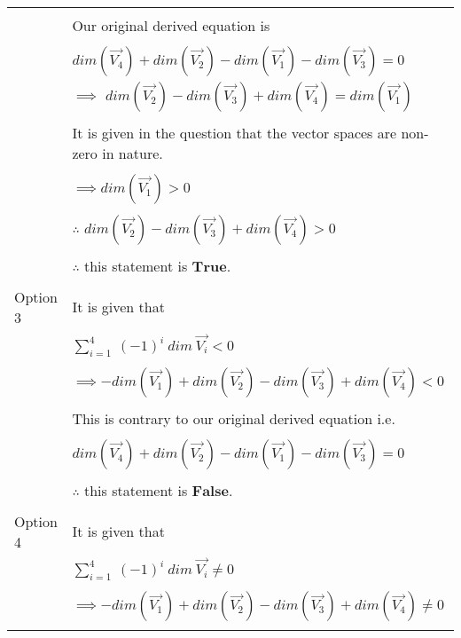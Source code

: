 \documentclass[journal,12pt]{IEEEtran}
\begin{document}
\begin{longtable}{|l|l|}
		& \\
		& Our original derived equation is \\
		& \\
		& \qquad \qquad $dim(\vec{V_4}) + dim(\vec{V_2}) - dim(\vec{V_1}) - dim(\vec{V_3}) = 0$ \\
		& \qquad $\implies$ $dim(\vec{V_2}) - dim(\vec{V_3}) + dim(\vec{V_4}) = dim(\vec{V_1})$ \\
		& \\
		& It is given in the question that the vector spaces are non-zero in nature. \\
		& \\
		& $\implies dim(\vec{V_1}) > 0$ \\
		& \\ 
		& \qquad \qquad $\therefore$ $dim(\vec{V_2}) - dim(\vec{V_3}) + dim(\vec{V_4}) > 0$\\
		& \\
		& $\therefore$ this statement is $\mathbf{True}$. \\
		&\\
		\hline
		\multirow{3}{*}{Option 3} & \\
		& It is given that \\
		& \\
		& $\sum_{i=1}^{4} \ (-1)^{i} \ dim \ \vec{V_i} < 0$ \\
		& \\
		& $\implies - dim(\vec{V_1}) + dim(\vec{V_2}) - dim(\vec{V_3}) +  dim(\vec{V_4}) < 0$ \\
		& \\
		& This is contrary to our original derived equation i.e. \\
		& \\
		& \qquad \qquad $dim(\vec{V_4}) + dim(\vec{V_2}) - dim(\vec{V_1}) - dim(\vec{V_3}) = 0$ \\
		& \\
		& $\therefore$ this statement is $\mathbf{False}$. \\
		&\\
		\hline
		\multirow{3}{*}{Option 4} & \\
		& It is given that \\
		& \\
		& $\sum_{i=1}^{4} \ (-1)^{i} \ dim \ \vec{V_i} \neq 0$ \\
		& \\
		& $\implies - dim(\vec{V_1}) + dim(\vec{V_2}) - dim(\vec{V_3}) +  dim(\vec{V_4}) \neq 0$ \\
		& \\

\end{longtable}
\end{document}
